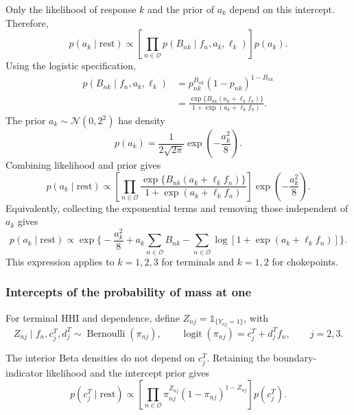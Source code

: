 \documentclass[pdftex,12pt,openright,a4paper,oneside]{book}
\begin{document}
Only the likelihood of response $k$ and the prior
of $a_k$ depend on this intercept. Therefore,
\begin{equation*}
p(a_k\mid\mathrm{rest})
\propto
\left[
\prod_{n\in\mathcal{O}}
p(B_{nk}\mid f_n,a_k,\ell_k)
\right]
p(a_k).
\end{equation*}
Using the logistic specification,
\begin{equation*}
\begin{aligned}
p(B_{nk}\mid f_n,a_k,\ell_k)
&=
p_{nk}^{B_{nk}}(1-p_{nk})^{1-B_{nk}}
\\
&=
\frac{
\exp\{B_{nk}(a_k+\ell_kf_n)\}
}{
1+\exp(a_k+\ell_kf_n)
}.
\end{aligned}
\end{equation*}
The prior $a_k\sim\mathcal{N}(0,2^2)$ has density
\begin{equation*}
p(a_k)=
\frac{1}{2\sqrt{2\pi}}
\exp\!\left(-\frac{a_k^2}{8}\right).
\end{equation*}
Combining likelihood and prior gives
\begin{equation*}
p(a_k\mid\mathrm{rest})
\propto
\left[
\prod_{n\in\mathcal{O}}
\frac{
\exp\{B_{nk}(a_k+\ell_kf_n)\}
}{
1+\exp(a_k+\ell_kf_n)
}
\right]
\exp\!\left(-\frac{a_k^2}{8}\right).
\end{equation*}
Equivalently, collecting the exponential terms
and removing those independent of $a_k$ gives
\begin{equation*}
p(a_k\mid\mathrm{rest})
\propto
\exp\Bigg\{-\frac{a_k^2}{8}+
a_k\sum_{n\in\mathcal{O}}B_{nk}-
\sum_{n\in\mathcal{O}}
\log\!\left[
1+\exp(a_k+\ell_kf_n)
\right]
\Bigg\}.
\end{equation*}
This expression applies to $k=1,2,3$ for terminals
and $k=1,2$ for chokepoints.

\subsubsection{Intercepts of the probability of mass at one}

For terminal HHI and dependence, define
$Z_{nj}=\mathds{1}_{\{Y_{nj}=1\}}$, with
\begin{equation*}
Z_{nj}\mid f_n,c_j^T,d_j^T
\sim\operatorname{Bernoulli}(\pi_{nj}),
\qquad
\operatorname{logit}(\pi_{nj})
=
c_j^T+d_j^Tf_n,
\qquad j=2,3.
\end{equation*}

The interior Beta densities do not depend on
$c_j^T$. Retaining the boundary-indicator
likelihood and the intercept prior gives
\begin{equation*}
p(c_j^T\mid\mathrm{rest})
\propto
\left[
\prod_{n\in\mathcal{O}}
\pi_{nj}^{Z_{nj}}
(1-\pi_{nj})^{1-Z_{nj}}
\right]
p(c_j^T).
\end{equation*}
\end{document}
